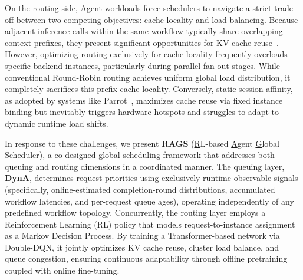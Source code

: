 \documentclass[sigconf,review,anonymous]{acmart}
\begin{document}
On the routing side, Agent workloads force schedulers to navigate a strict trade-off between two competing objectives: 
cache locality and load balancing. Because adjacent inference calls within the same workflow typically share overlapping 
context prefixes, they present significant opportunities for KV cache reuse~\cite{kwon2023efficient,zheng2024sglang}. 
However, optimizing routing exclusively for cache locality frequently overloads specific backend instances, particularly 
during parallel fan-out stages. While conventional Round-Robin routing achieves uniform global load distribution, it 
completely sacrifices this prefix cache locality. Conversely, static session affinity, as adopted by systems like 
Parrot~\cite{lin2024parrot}, maximizes cache reuse via fixed instance binding but inevitably triggers hardware hotspots 
and struggles to adapt to dynamic runtime load shifts.

In response to these challenges, we present \textbf{RAGS} (\underline{R}L-based \underline{A}gent 
\underline{G}lobal \underline{S}cheduler), a co-designed global scheduling framework that 
addresses both queuing and routing dimensions in a coordinated manner. The queuing layer, \textbf{DynA}, 
determines request priorities using exclusively runtime-observable signals (specifically, online-estimated completion-round distributions, 
accumulated workflow latencies, and per-request queue ages), operating independently of any 
predefined workflow topology. Concurrently, the routing layer employs a Reinforcement Learning 
(RL) policy that models request-to-instance assignment as a Markov Decision Process. By training 
a Transformer-based network via Double-DQN, it jointly optimizes KV cache reuse, cluster load balance, 
and queue congestion, ensuring continuous adaptability through offline pretraining coupled with online 
fine-tuning.
\end{document}
